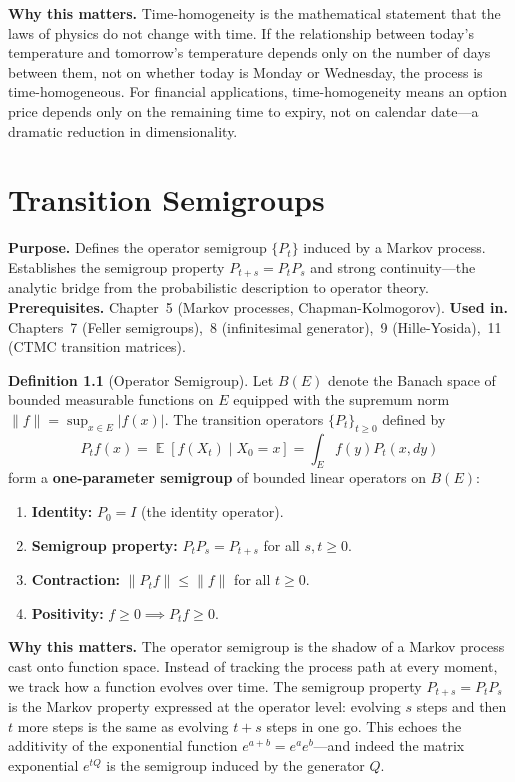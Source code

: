 \documentclass[11pt,a4paper,openany]{book}
\theoremstyle{definition}
\newtheorem{definition}{Definition}[chapter]
\theoremstyle{plain}
\theoremstyle{remark}
\DeclareMathOperator{\E}{\mathbb{E}}
\newcommand{\1}{\mathbbm{1}}
\begin{document}
\medskip
\noindent\textbf{Why this matters.} Time-homogeneity is the mathematical statement that the laws of physics do not change with time. If the relationship between today's temperature and tomorrow's temperature depends only on the number of days between them, not on whether today is Monday or Wednesday, the process is time-homogeneous. For financial applications, time-homogeneity means an option price depends only on the remaining time to expiry, not on calendar date---a dramatic reduction in dimensionality.

\chapter{Transition Semigroups}

\noindent\textbf{Purpose.} Defines the operator semigroup $\{P_{t}\}$ induced by a Markov process. Establishes the semigroup property $P_{t+s} = P_{t}P_{s}$ and strong continuity---the analytic bridge from the probabilistic description to operator theory.
\textbf{Prerequisites.} Chapter~5 (Markov processes, Chapman-Kolmogorov).
\textbf{Used in.} Chapters~7 (Feller semigroups),~8 (infinitesimal generator),~9 (Hille-Yosida),~11 (CTMC transition matrices).

\begin{definition}[Operator Semigroup]
Let $B(E)$ denote the Banach space of bounded measurable functions on $E$ equipped with the supremum norm $\|f\| = \sup_{x \in E} |f(x)|$. The transition operators $\{P_{t}\}_{t \geq 0}$ defined by
\[
P_{t} f(x) = \E[f(X_{t}) \mid X_{0} = x] = \int_{E} f(y) P_{t}(x, dy)
\]
form a \textbf{one-parameter semigroup} of bounded linear operators on $B(E)$:
\begin{enumerate}[label=(\arabic*)]
    \item \textbf{Identity:} $P_{0} = I$ (the identity operator).
    \item \textbf{Semigroup property:} $P_{t} P_{s} = P_{t+s}$ for all $s,t \geq 0$.
    \item \textbf{Contraction:} $\|P_{t} f\| \leq \|f\|$ for all $t \geq 0$.
    \item \textbf{Positivity:} $f \geq 0 \implies P_{t} f \geq 0$.
\end{enumerate}
\end{definition}

\medskip
\noindent\textbf{Why this matters.} The operator semigroup is the shadow of a Markov process cast onto function space. Instead of tracking the process path at every moment, we track how a function evolves over time. The semigroup property $P_{t+s} = P_t P_s$ is the Markov property expressed at the operator level: evolving $s$ steps and then $t$ more steps is the same as evolving $t+s$ steps in one go. This echoes the additivity of the exponential function $e^{a+b} = e^a e^b$---and indeed the matrix exponential $e^{tQ}$ is the semigroup induced by the generator $Q$.
\end{document}
